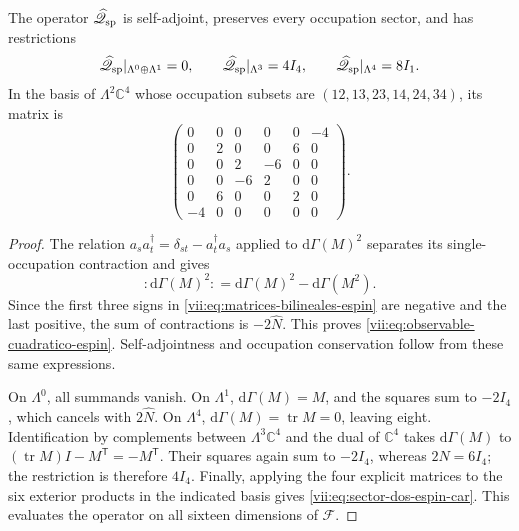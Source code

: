 \begin{proposition}
\label{vii:prop:operador-espin-car}
The operator \(\widehat{\mathscr Q}_{\rm sp}\) is self-adjoint,
preserves every occupation sector, and has restrictions
\begin{equation}
 \widehat{\mathscr Q}_{\rm sp}|_{\Lambda^0\oplus\Lambda^1}=0,
 \qquad
 \widehat{\mathscr Q}_{\rm sp}|_{\Lambda^3}=4I_4,
 \qquad
 \widehat{\mathscr Q}_{\rm sp}|_{\Lambda^4}=8I_1.
 \label{vii:eq:sectores-espin-car}
\end{equation}
In the basis of \(\Lambda^2\mathbb C^4\) whose occupation
subsets are \((12,13,23,14,24,34)\), its matrix is
\begin{equation}
 \begin{pmatrix}
 0&0&0&0&0&-4\\
 0&2&0&0&6&0\\
 0&0&2&-6&0&0\\
 0&0&-6&2&0&0\\
 0&6&0&0&2&0\\
 -4&0&0&0&0&0
 \end{pmatrix}.
 \label{vii:eq:sector-dos-espin-car}
\end{equation}
\end{proposition}
\begin{proof}
The relation \(a_s a_t^\dagger=\delta_{st}-a_t^\dagger a_s\)
applied to \(\mathrm d\Gamma(M)^2\) separates its
single-occupation contraction and gives
\[
 :\!\mathrm d\Gamma(M)^2\!:
 =\mathrm d\Gamma(M)^2-\mathrm d\Gamma(M^2).
\]
Since the first three signs in
\eqref{vii:eq:matrices-bilineales-espin} are negative and the last
positive, the sum of contractions is \(-2\widehat N\).
This proves \eqref{vii:eq:observable-cuadratico-espin}.
Self-adjointness and occupation conservation follow from these same
expressions.

On \(\Lambda^0\), all summands vanish. On \(\Lambda^1\),
\(\mathrm d\Gamma(M)=M\), and the squares sum to \(-2I_4\),
which cancels with \(2\widehat N\). On \(\Lambda^4\),
\(\mathrm d\Gamma(M)=\operatorname{tr}M=0\), leaving eight.
Identification by complements between \(\Lambda^3\mathbb C^4\)
and the dual of \(\mathbb C^4\) takes
\(\mathrm d\Gamma(M)\) to
\((\operatorname{tr}M)I-M^{\mathsf T}=-M^{\mathsf T}\).
Their squares again sum to \(-2I_4\), whereas
\(2\widehat N=6I_4\); the restriction is therefore \(4I_4\).
Finally, applying the four explicit matrices to the six exterior
products in the indicated basis gives
\eqref{vii:eq:sector-dos-espin-car}. This evaluates the operator
on all sixteen dimensions of \(\mathcal F\).
\end{proof}

